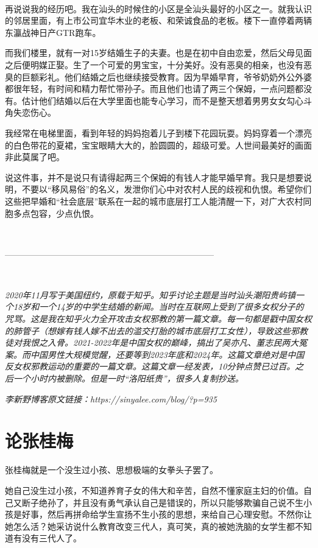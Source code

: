 \ 

再说说我的经历吧。我在汕头的时候住的小区是全汕头最好的小区之一。就我认识的邻居里面，有上市公司宜华木业的老板、和荣诚食品的老板。楼下一直停着两辆东瀛战神日产GTR跑车。

而我们楼里，就有一对15岁结婚生子的夫妻。也是在初中自由恋爱，然后父母见面之后便明媒正娶。生了一个可爱的男宝宝，十分美好。没有恶臭的相亲，也没有恶臭的巨额彩礼。他们结婚之后也继续接受教育。因为早婚早育，爷爷奶奶外公外婆都很年轻，有时间和精力帮忙带孙子。而且他们也请了两三个保姆，一点问题都没有。估计他们结婚以后在大学里面也能专心学习，而不是整天想着男男女女勾心斗角失恋伤心。

我经常在电梯里面，看到年轻的妈妈抱着儿子到楼下花园玩耍。妈妈穿着一个漂亮的白色带花的夏裙，宝宝眼睛大大的，脸圆圆的，超级可爱。人世间最美好的画面非此莫属了吧。

说这件事，并不是说只有请得起两三个保姆的有钱人才能早婚早育。我只是想要说明，不要以``移风易俗''的名义，发泄你们心中对农村人民的歧视和仇恨。希望你们这些把早婚和``社会底层''联系在一起的城市底层打工人能清醒一下，对广大农村同胞多点包容，少点仇恨。

\ 

--------------------------------------------------------------------------

\ 

\textit{2020年11月写于美国纽约，原载于知乎。知乎讨论主题是当时汕头潮阳贵屿镇一个18岁和一个14岁的中学生结婚的新闻。当时在互联网上受到了很多女权分子的咒骂。这是我在知乎火力全开攻击女权邪教的第一篇文章。每一句都是戳中国女权的肺管子（想嫁有钱人嫁不出去的滥交打胎的城市底层打工女性），导致这些邪教徒对我恨之入骨。2021-2022年是中国女权的巅峰，搞出了吴亦凡、董志民两大冤案。而中国男性大规模觉醒，还要等到2023年底和2024年。这篇文章绝对是中国反女权邪教运动的重要的一篇文章。这篇文章一经发表，10分钟点赞已过百。之后一个小时内被删除。但是一时``洛阳纸贵''，很多人复制抄送。}

\textit{李新野博客原文链接：https://sinyalee.com/blog/?p=935}

\newpage

\section{论张桂梅}

张桂梅就是一个没生过小孩、思想极端的女拳头子罢了。

她自己没生过小孩，不知道养育子女的伟大和辛苦，自然不懂家庭主妇的价值。自己又断子绝孙了，并且没有勇气承认自己是错误的，所以只能够欺骗自己说不生小孩是好事，然后再拼命给学生宣扬不生小孩的思想，来给自己心理安慰。不然你让她怎么活？她采访说什么教育改变三代人，真可笑，真的被她洗脑的女学生都不知道有没有三代人了。

